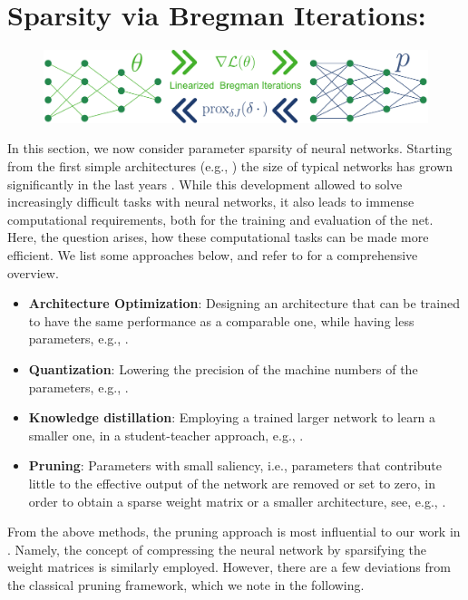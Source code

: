 \section{Sparsity via Bregman Iterations: \cite{bungert2022bregman}}\label{sec:BREG}
%
\begin{figure}
\centering
\includegraphics[width=.5\textwidth]{atelier/Breg_dist/BregmanPosterCartoon.pdf}
\end{figure}
%
%
In this section, we now consider parameter sparsity of neural networks. Starting from the first simple architectures (e.g., \cite{rosenblatt1958perceptron}) the size of typical networks has grown significantly in the last years \cite{hoefler2021sparsity}. While this development allowed to solve increasingly difficult tasks with neural networks, it also leads to immense computational requirements, both for the training and evaluation of the net. Here, the question arises, how these computational tasks can be made more efficient. We list some approaches below, and refer to \cite{gholami2021survey} for a comprehensive overview.
%
\begin{itemize}
\item \textbf{Architecture Optimization}: Designing an architecture that can be trained to have the same performance as a comparable one, while having less parameters, e.g., \cite{elsken2019neural, howard2017mobilenets}.
%
\item \textbf{Quantization}: Lowering the precision of the machine numbers of the parameters, e.g., \cite{banner2018scalable, courbariaux2014training}.
%
\item \textbf{Knowledge distillation}: Employing a trained larger network to learn a smaller one, in a student-teacher approach, e.g., \cite{schmidhuber1992learning, hinton2015distilling}.
%
\item \textbf{Pruning}: Parameters with small saliency, i.e., parameters that contribute little to the effective output of the network are removed or set to zero, in order to obtain a sparse weight matrix or a smaller architecture, see, e.g., \cite{lecun1989optimal, hassibi1993optimal}.
\end{itemize}
%
%
From the above methods, the pruning approach is most influential to our work in \cite{bungert2022bregman}. Namely, the concept of compressing the neural network by sparsifying the weight matrices is similarly employed. However, there are a few deviations from the classical pruning framework, which we note in the following.

